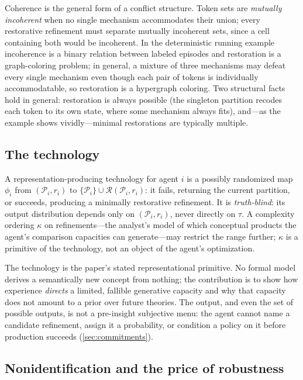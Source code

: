 Coherence is the general form of a conflict structure.  Token sets are
\emph{mutually incoherent} when no single mechanism accommodates their
union; every restorative refinement must separate mutually incoherent sets,
since a cell containing both would be incoherent.  In the deterministic
running example incoherence is a binary relation between labeled episodes and
restoration is a graph-coloring problem; in general, a mixture of three
mechanisms may defeat every single mechanism even though each pair of tokens
is individually accommodatable, so restoration is a hypergraph coloring.
Two structural facts hold in general: restoration is always possible (the
singleton partition recodes each token to its own state, where some mechanism
always fits), and---as the example shows vividly---minimal restorations are
typically multiple.

\subsection{The technology}

\begin{definition}
\label{def:technology}
A representation-producing technology for agent $i$ is a possibly randomized
map $\phi_i$ from $(\mathcal P_i,r_i)$ to
$\{\mathcal P_i\}\cup\mathcal R(\mathcal P_i,r_i)$: it fails, returning the
current partition, or succeeds, producing a minimally restorative
refinement.  It is \emph{truth-blind}: its output distribution depends only
on $(\mathcal P_i,r_i)$, never directly on $\tau$.  A complexity ordering
$\kappa$ on refinements---the analyst's model of which conceptual products
the agent's comparison capacities can generate---may restrict the range
further; $\kappa$ is a primitive of the technology, not an object of the
agent's optimization.
\end{definition}

The technology is the paper's stated representational primitive.  No formal
model derives a semantically new concept from nothing; the contribution is to
show how experience \emph{directs} a limited, fallible generative capacity
and why that capacity does not amount to a prior over future theories.  The
output, and even the set of possible outputs, is not a pre-insight
subjective menu: the agent cannot name a candidate refinement, assign it a
probability, or condition a policy on it before production succeeds
(\cref{sec:commitments}).

\subsection{Nonidentification and the price of robustness}

